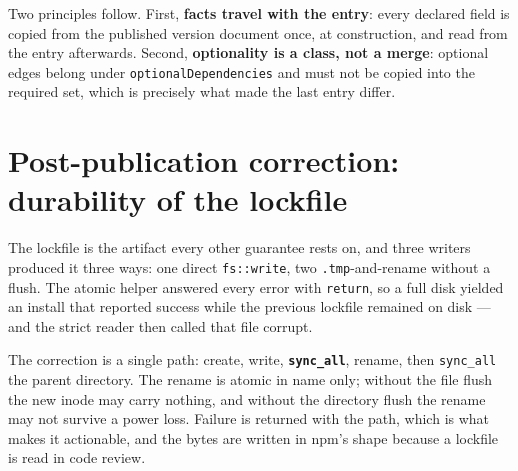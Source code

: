 \documentclass[
  11pt,
  letterpaper,
]{article}
\begin{document}
Two principles follow. First, \textbf{facts travel with the entry}: every declared field is copied
from the published version document once, at construction, and read from the entry afterwards.
Second, \textbf{optionality is a class, not a merge}: optional edges belong under
\texttt{optionalDependencies} and must not be copied into the required set, which is precisely what
made the last entry differ.


\section{Post-publication correction: durability of the lockfile}

The lockfile is the artifact every other guarantee rests on, and three writers produced it three
ways: one direct \texttt{fs::write}, two \texttt{.tmp}-and-rename without a flush. The atomic helper
answered every error with \texttt{return}, so a full disk yielded an install that reported success
while the previous lockfile remained on disk --- and the strict reader then called that file corrupt.

The correction is a single path: create, write, \textbf{\texttt{sync\_all}}, rename, then
\texttt{sync\_all} the parent directory. The rename is atomic in name only; without the file flush
the new inode may carry nothing, and without the directory flush the rename may not survive a power
loss. Failure is returned with the path, which is what makes it actionable, and the bytes are
written in npm's shape because a lockfile is read in code review.
\end{document}
